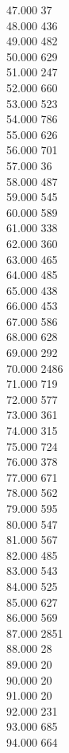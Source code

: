 { 47.000	37 \\
 48.000	436 \\
 49.000	482 \\
 50.000	629 \\
 51.000	247 \\
 52.000	660 \\
 53.000	523 \\
 54.000	786 \\
 55.000	626 \\
 56.000	701 \\
 57.000	36 \\
 58.000	487 \\
 59.000	545 \\
 60.000	589 \\
 61.000	338 \\
 62.000	360 \\
 63.000	465 \\
 64.000	485 \\
 65.000	438 \\
 66.000	453 \\
 67.000	586 \\
 68.000	628 \\
 69.000	292 \\
 70.000	2486 \\
 71.000	719 \\
 72.000	577 \\
 73.000	361 \\
 74.000	315 \\
 75.000	724 \\
 76.000	378 \\
 77.000	671 \\
 78.000	562 \\
 79.000	595 \\
 80.000	547 \\
 81.000	567 \\
 82.000	485 \\
 83.000	543 \\
 84.000	525 \\
 85.000	627 \\
 86.000	569 \\
 87.000	2851 \\
 88.000	28 \\
 89.000	20 \\
 90.000	20 \\
 91.000	20 \\
 92.000	231 \\
 93.000	685 \\
 94.000	664 \\
}
